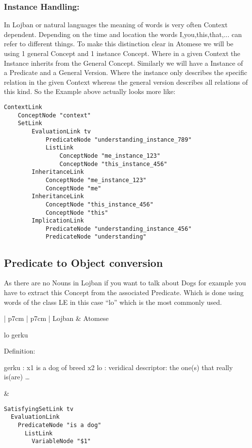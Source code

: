 \subsubsection{Instance Handling:}

In Lojban or natural languages the meaning of words is very often Context dependent. Depending on the time and location the words I,you,this,that,... can refer to different things. To make this distinction clear in Atomese we will be using 1 general Concept and 1 instance Concept. Where in a given Context the Instance inherits from the General Concept.
Similarly we will have a Instance of a Predicate and a General Version. Where the instance only describes the specific relation in the given Context whereas the general version describes all relations of this kind.
So the Example above actually looks more like:

\begin{lstlisting}
ContextLink
    ConceptNode "context"
    SetLink
        EvaluationLink tv
            PredicateNode "understanding_instance_789"
            ListLink
                ConceptNode "me_instance_123"
                ConceptNode "this_instance_456"
        InheritanceLink
            ConceptNode "me_instance_123"
            ConceptNode "me"
        InheritanceLink
            ConceptNode "this_instance_456"
            ConceptNode "this"
        ImplicationLink
            PredicateNode "understanding_instance_456"
            PredicateNode "understanding"
\end{lstlisting}


\subsection{Predicate to Object conversion}

As there are no Nouns in Lojban if you want to talk about Dogs for example you have to extract this Concept from the associated Predicate. Which is done using words of the class LE in this case “lo” which is the most commonly used.

\begin{center}
    \begin{tabular}{| p{7cm} | p{7cm} |}
        \hline
        Lojban & Atomese \\
        \hline
        \begin{center}
lo gerku

Definition:

gerku : x1 is a dog of breed x2
lo : veridical descriptor: the one(s) that really is(are) …
        \end{center}
        &
        \begin{lstlisting}
SatisfyingSetLink tv
  EvaluationLink
    PredicateNode "is a dog"
      ListLink
        VariableNode "$1"
        \end{lstlisting} \\
        \hline
    \end{tabular}
\end{center}


